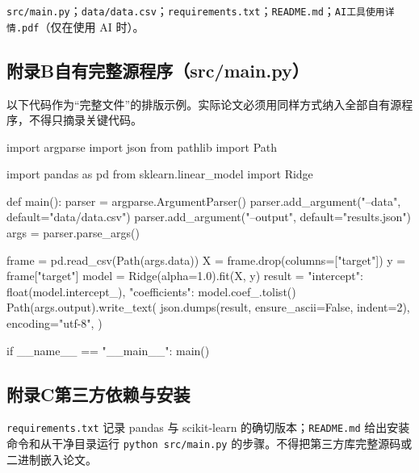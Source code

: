 \documentclass[12pt,a4paper]{article}
\begin{document}
\noindent\texttt{src/main.py}；\texttt{data/data.csv}；\texttt{requirements.txt}；\texttt{README.md}；\texttt{AI工具使用详情.pdf}（仅在使用 AI 时）。

\subsection*{附录B\quad 自有完整源程序（src/main.py）}

以下代码作为“完整文件”的排版示例。实际论文必须用同样方式纳入全部自有源程序，不得只摘录关键代码。

\begin{pycode}
import argparse
import json
from pathlib import Path

import pandas as pd
from sklearn.linear_model import Ridge

def main():
    parser = argparse.ArgumentParser()
    parser.add_argument("--data", default="data/data.csv")
    parser.add_argument("--output", default="results.json")
    args = parser.parse_args()

    frame = pd.read_csv(Path(args.data))
    X = frame.drop(columns=["target"])
    y = frame["target"]
    model = Ridge(alpha=1.0).fit(X, y)
    result = {"intercept": float(model.intercept_),
              "coefficients": model.coef_.tolist()}
    Path(args.output).write_text(
        json.dumps(result, ensure_ascii=False, indent=2),
        encoding="utf-8",
    )

if __name__ == "__main__":
    main()
\end{pycode}

\subsection*{附录C\quad 第三方依赖与安装}

\texttt{requirements.txt} 记录 pandas 与 scikit-learn 的确切版本；\texttt{README.md} 给出安装命令和从干净目录运行 \texttt{python src/main.py} 的步骤。不得把第三方库完整源码或二进制嵌入论文。
\end{document}
